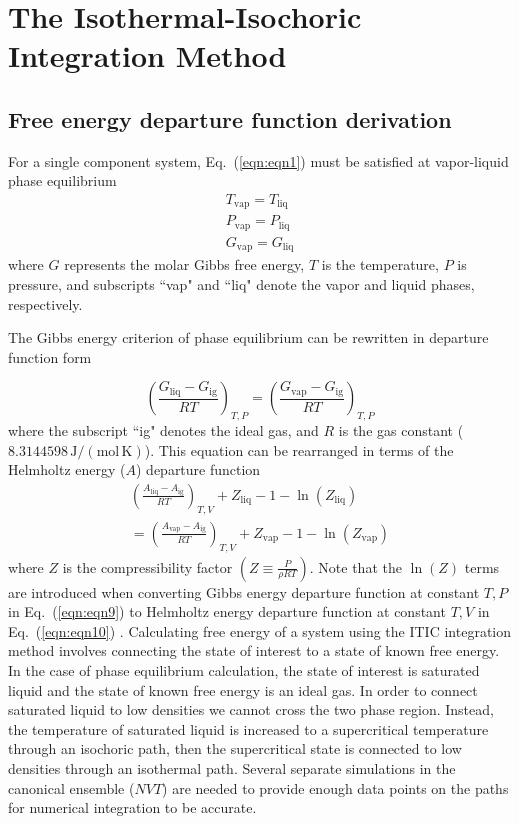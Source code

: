\documentclass[5p,times]{elsarticle}
\begin{document}
\section{The Isothermal-Isochoric Integration Method} \label{sec:ITIC-method}
\subsection{Free energy departure function derivation}
For a single component system, Eq.~(\ref{eqn:eqn1}) must be satisfied at vapor-liquid phase equilibrium
\begin{equation}
\begin{array}{l}
{T_\mathrm{vap} =T_\mathrm{liq} }\\
{P_\mathrm{vap} =P_\mathrm{liq} }\\
{G_\mathrm{vap} =G_\mathrm{liq} }
\end{array} 
\label{eqn:eqn1}
\end{equation}
where $G$ represents the molar Gibbs free energy, $T$ is the temperature, $P$ is pressure, and subscripts ``vap" and ``liq" denote the vapor and liquid phases, respectively. 

The Gibbs energy criterion of phase equilibrium can be rewritten in departure function form

\begin{equation}
\left(\frac{G_\mathrm{liq} -G_\mathrm{ig} }{RT}\right)_{T,P} =\left(\frac{G_\mathrm{vap}-G_\mathrm{ig}}{RT}\right)_{T,P} \label{eqn:eqn9}
\end{equation}
where the subscript ``ig" denotes the ideal gas, and $R$ is the gas constant ($8.3144598\,\mathrm{J/(mol\,K)}$). This equation can be rearranged in terms of the Helmholtz energy ($A$) departure function 
\begin{equation}
\begin{array}{l}
{\left(\frac{A_\mathrm{liq} -A_\mathrm{ig} }{RT} \right)_{T,V} +Z_{\mathrm{liq}} -1-\ln(Z_{\mathrm{liq}})} 
\\ 
{=\left(\frac{A_\mathrm{vap} -A_\mathrm{ig} }{RT} \right)_{T,V} +Z_{\mathrm{vap}} -1-\ln(Z_{\mathrm{vap}})}  
\end{array} 
\label{eqn:eqn10}
\end{equation}
where $Z$ is the compressibility factor $(Z \equiv \frac{P}{\rho RT})$. Note that the $\ln(Z)$ terms are introduced when converting Gibbs energy departure function at constant $T,P$ in Eq.~(\ref{eqn:eqn9}) to Helmholtz energy departure function at constant $T,V$ in Eq.~(\ref{eqn:eqn10}) \cite{Elliott1999}. Calculating free energy of a system using the ITIC integration method involves connecting the state of interest to a state of known free energy. In the case of phase equilibrium calculation, the state of interest is saturated liquid and the state of known free energy is an ideal gas. In order to connect saturated liquid to low densities we cannot cross the two phase region. Instead, the temperature of saturated liquid is increased to a supercritical temperature through an isochoric path, then the supercritical state is connected to low densities through an isothermal path. Several separate simulations in the canonical ensemble ($NVT$) are needed to provide enough data points on the paths for numerical integration to be accurate. 
\end{document}
